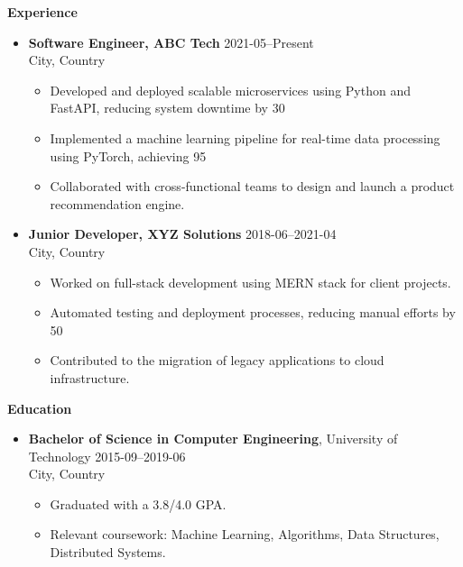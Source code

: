\documentclass[10pt]{article}
\begin{document}
    \vspace{10pt}
    \noindent \textbf{Experience}
    \begin{itemize}[leftmargin=0.2in]
    
        \item \textbf{Software Engineer, ABC Tech} \hfill 2021-05--Present \\
        City, Country
        \begin{itemize}[leftmargin=0.3in]
        \item Developed and deployed scalable microservices using Python and FastAPI, reducing system downtime by 30%
\item Implemented a machine learning pipeline for real-time data processing using PyTorch, achieving 95%
\item Collaborated with cross-functional teams to design and launch a product recommendation engine.
\end{itemize}\n
        \item \textbf{Junior Developer, XYZ Solutions} \hfill 2018-06--2021-04 \\
        City, Country
        \begin{itemize}[leftmargin=0.3in]
        \item Worked on full-stack development using MERN stack for client projects.
\item Automated testing and deployment processes, reducing manual efforts by 50%
\item Contributed to the migration of legacy applications to cloud infrastructure.
\end{itemize}\n\end{itemize}\n
    \vspace{10pt}
    \noindent \textbf{Education}
    \begin{itemize}[leftmargin=0.2in]
    
        \item \textbf{Bachelor of Science in Computer Engineering}, University of Technology \hfill 2015-09--2019-06 \\
        City, Country
        \begin{itemize}[leftmargin=0.3in]
        \item Graduated with a 3.8/4.0 GPA.
\item Relevant coursework: Machine Learning, Algorithms, Data Structures, Distributed Systems.
\end{itemize}\n\end{itemize}\n
    \vspace{10pt}
\end{document}
